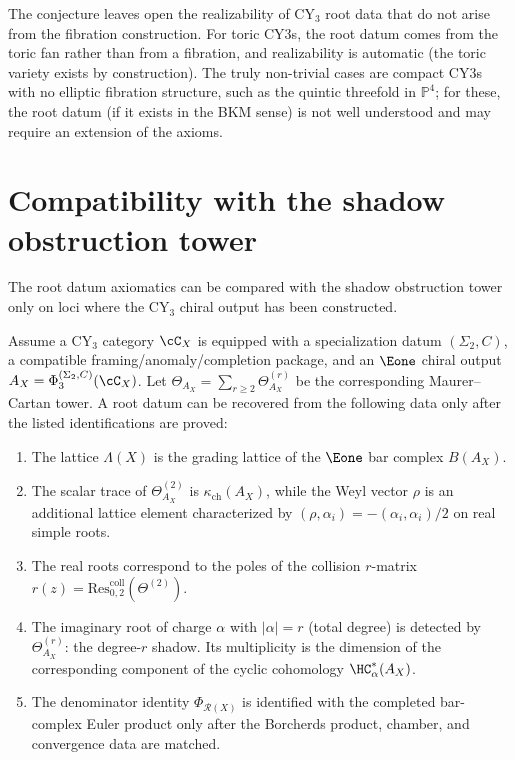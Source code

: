 \begin{remark}
\label{rem:non-fibered}
The conjecture leaves open the realizability of CY$_3$ root data that do not arise from the fibration construction. For toric CY3s, the root datum comes from the toric fan rather than from a fibration, and realizability is automatic (the toric variety exists by construction). The truly non-trivial cases are compact CY3s with no elliptic fibration structure, such as the quintic threefold in $\mathbb{P}^4$; for these, the root datum (if it exists in the BKM sense) is not well understood and may require an extension of the axioms.
\end{remark}


\section{Compatibility with the shadow obstruction tower}
\label{sec:shadow-tower}

The root datum axiomatics can be compared with the shadow obstruction
tower only on loci where the CY$_3$ chiral output has been constructed.

\begin{conjecture}
\label{conj:root-datum-shadow}

Assume a CY$_3$ category $\cC_X$ is equipped with a specialization
datum $(\Sigma_2,C)$, a compatible framing/anomaly/completion package,
and an $\Eone$ chiral output
$A_X=\Phi_3^{(\Sigma_2,C)}(\cC_X)$. Let
$\Theta_{A_X} = \sum_{r \geq 2} \Theta^{(r)}_{A_X}$ be the corresponding
Maurer--Cartan tower. A root datum can be recovered from the following
data only after the listed identifications are proved:
\begin{enumerate}[label=(\roman*)]
 \item The lattice $\Lambda(X)$ is the grading lattice of the $\Eone$ bar
 complex $B(A_X)$.
 \item The scalar trace of $\Theta^{(2)}_{A_X}$ is
 $\kappa_{\mathrm{ch}}(A_X)$, while the Weyl vector $\rho$ is an
 additional lattice element characterized by
 $(\rho,\alpha_i)=-(\alpha_i,\alpha_i)/2$ on real simple roots.
 \item The real roots correspond to the poles of the collision $r$-matrix $r(z) = \mathrm{Res}^{\mathrm{coll}}_{0,2}(\Theta^{(2)})$.
 \item The imaginary root of charge $\alpha$ with $|\alpha| = r$ (total degree) is detected by $\Theta^{(r)}_{A_X}$: the degree-$r$ shadow. Its multiplicity is the dimension of the corresponding component of the cyclic cohomology $\HC^*_\alpha(A_X)$.
 \item The denominator identity $\Phi_{\mathcal{R}(X)}$ is identified
 with the completed bar-complex Euler product only after the Borcherds
 product, chamber, and convergence data are matched.
\end{enumerate}
\end{conjecture}

